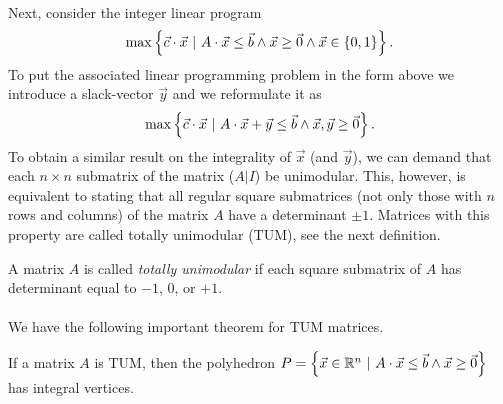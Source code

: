 \paragraph{}
Next, consider the integer linear program
\begin{equation}
\max\left\{ \vec{c}\cdot\vec{x}\ |\ A\cdot\vec{x}\leq\vec{b}\wedge\vec{x}\geq\vec{0}\wedge\vec{x}\in\left\{ 0,1 \right\} \right\}.
\end{equation}
To put the associated linear programming problem in the form above we introduce a slack-vector $\vec{y}$ and we reformulate it as
\begin{equation}
\max\left\{ \vec{c}\cdot\vec{x}\ |\ A\cdot\vec{x}+\vec{y}\leq\vec{b}\wedge\vec{x},\vec{y}\geq\vec{0} \right\}.
\end{equation}
To obtain a similar result on the integrality of $\vec{x}$ (and $\vec{y}$), we can demand that each $n\times n$ submatrix of the matrix ($A|I$) be unimodular. This, however, is equivalent to stating that all regular square submatrices (not only those with $n$ rows and columns) of the matrix $A$ have a determinant $\pm 1$. Matrices with this property are called totally unimodular (TUM), see the next definition.

\begin{definition}
A matrix $A$ is called \emph{totally unimodular} if each square submatrix of $A$ has determinant equal to $-1$, $0$, or $+1$.
\end{definition}

\paragraph{}
We have the following important theorem for TUM matrices.

\begin{theorem}
If a matrix $A$ is TUM, then the polyhedron $P=\left\{ \vec{x}\in\mathbb{R}^n\ |\ A\cdot\vec{x}\leq\vec{b}\wedge\vec{x}\geq\vec{0} \right\}$ has integral vertices.
\end{theorem}

